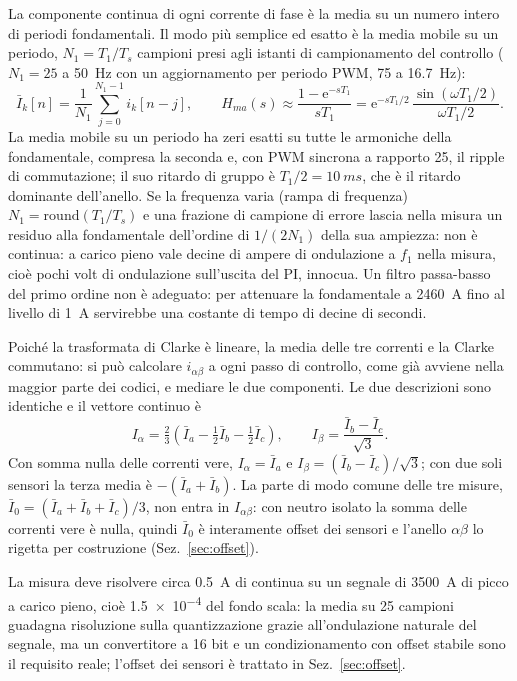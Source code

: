\documentclass[10pt,a4paper]{scrartcl}
\newcommand{\ee}{\mathrm{e}}
\newcommand{\Ts}{T_s}
\newcommand{\Tuno}{T_1}
\newcommand{\ab}{\alpha\beta}
\newcommand{\Iab}{I_{\ab}}
\begin{document}
\begin{onehalfspace}
La componente continua di ogni corrente di fase è la media su un numero intero di periodi fondamentali. Il modo più semplice ed esatto è la media mobile su un periodo, $N_1 = \Tuno/\Ts$ campioni presi agli istanti di campionamento del controllo ($N_1 = 25$ a \SI{50}{Hz} con un aggiornamento per periodo PWM, 75 a \SI{16.7}{Hz}):
\begin{equation}
\bar I_k[n] = \frac{1}{N_1}\sum_{j=0}^{N_1-1} i_k[n-j], \qquad
H_{ma}(s) \approx \frac{1 - \ee^{-s\Tuno}}{s\Tuno} = \ee^{-s\Tuno/2}\,\frac{\sin(\omega\Tuno/2)}{\omega\Tuno/2}.
\label{eq:mediamobile}
\end{equation}
La media mobile su un periodo ha zeri esatti su tutte le armoniche della fondamentale, compresa la seconda e, con PWM sincrona a rapporto 25, il ripple di commutazione; il suo ritardo di gruppo è $\Tuno/2 = \SI{10}{ms}$, che è il ritardo dominante dell'anello. Se la frequenza varia (rampa di frequenza) $N_1 = \mathrm{round}(\Tuno/\Ts)$ e una frazione di campione di errore lascia nella misura un residuo alla fondamentale dell'ordine di $1/(2N_1)$ della sua ampiezza: non è continua: a carico pieno vale decine di ampere di ondulazione a $f_1$ nella misura, cioè pochi volt di ondulazione sull'uscita del PI, innocua. Un filtro passa-basso del primo ordine non è adeguato: per attenuare la fondamentale a \SI{2460}{A} fino al livello di \SI{1}{A} servirebbe una costante di tempo di decine di secondi.

Poiché la trasformata di Clarke è lineare, la media delle tre correnti e la Clarke commutano: si può calcolare $i_{\ab}$ a ogni passo di controllo, come già avviene nella maggior parte dei codici, e mediare le due componenti. Le due descrizioni sono identiche e il vettore continuo è
\begin{equation}
I_\alpha = \tfrac23\left(\bar I_a - \tfrac12\bar I_b - \tfrac12\bar I_c\right), \qquad I_\beta = \frac{\bar I_b - \bar I_c}{\sqrt3}.
\label{eq:Iab}
\end{equation}
Con somma nulla delle correnti vere, $I_\alpha = \bar I_a$ e $I_\beta = (\bar I_b - \bar I_c)/\sqrt3$; con due soli sensori la terza media è $-(\bar I_a + \bar I_b)$. La parte di modo comune delle tre misure, $\bar I_0 = (\bar I_a + \bar I_b + \bar I_c)/3$, non entra in $\Iab$: con neutro isolato la somma delle correnti vere è nulla, quindi $\bar I_0$ è interamente offset dei sensori e l'anello $\alpha\beta$ lo rigetta per costruzione (Sez.~\ref{sec:offset}).

La misura deve risolvere circa \SI{0.5}{A} di continua su un segnale di \SI{3500}{A} di picco a carico pieno, cioè \SI{1.5e-4}{} del fondo scala: la media su 25 campioni guadagna risoluzione sulla quantizzazione grazie all'ondulazione naturale del segnale, ma un convertitore a 16 bit e un condizionamento con offset stabile sono il requisito reale; l'offset dei sensori è trattato in Sez.~\ref{sec:offset}.


\end{onehalfspace}
\end{document}
